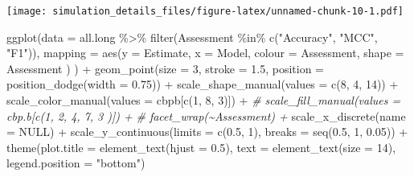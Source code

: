 \documentclass[
]{article}
\newenvironment{Shaded}{\begin{snugshade}}{\end{snugshade}}
\newcommand{\AttributeTok}[1]{\textcolor[rgb]{0.77,0.63,0.00}{#1}}
\newcommand{\CommentTok}[1]{\textcolor[rgb]{0.56,0.35,0.01}{\textit{#1}}}
\newcommand{\ConstantTok}[1]{\textcolor[rgb]{0.00,0.00,0.00}{#1}}
\newcommand{\DecValTok}[1]{\textcolor[rgb]{0.00,0.00,0.81}{#1}}
\newcommand{\FloatTok}[1]{\textcolor[rgb]{0.00,0.00,0.81}{#1}}
\newcommand{\FunctionTok}[1]{\textcolor[rgb]{0.00,0.00,0.00}{#1}}
\newcommand{\NormalTok}[1]{#1}
\newcommand{\SpecialCharTok}[1]{\textcolor[rgb]{0.00,0.00,0.00}{#1}}
\newcommand{\StringTok}[1]{\textcolor[rgb]{0.31,0.60,0.02}{#1}}
\begin{document}
\texttt{[image: simulation\_details\_files/figure-latex/unnamed-chunk-10-1.pdf]}

\begin{Shaded}
\begin{Highlighting}[]
\FunctionTok{ggplot}\NormalTok{(}\AttributeTok{data =}\NormalTok{ all.long }\SpecialCharTok{\%\textgreater{}\%} 
         \FunctionTok{filter}\NormalTok{(Assessment }\SpecialCharTok{\%in\%} \FunctionTok{c}\NormalTok{(}\StringTok{"Accuracy"}\NormalTok{, }\StringTok{"MCC"}\NormalTok{, }\StringTok{"F1"}\NormalTok{)),}
       \AttributeTok{mapping =} \FunctionTok{aes}\NormalTok{(}\AttributeTok{y =}\NormalTok{ Estimate,}
                     \AttributeTok{x =}\NormalTok{ Model, }
                     \AttributeTok{colour =}\NormalTok{ Assessment,}
                     \AttributeTok{shape =}\NormalTok{ Assessment}
\NormalTok{                     )}
\NormalTok{       ) }\SpecialCharTok{+}
  \FunctionTok{geom\_point}\NormalTok{(}\AttributeTok{size =} \DecValTok{3}\NormalTok{, }\AttributeTok{stroke =} \FloatTok{1.5}\NormalTok{,}
             \AttributeTok{position =} \FunctionTok{position\_dodge}\NormalTok{(}\AttributeTok{width =} \FloatTok{0.75}\NormalTok{)) }\SpecialCharTok{+}
  \FunctionTok{scale\_shape\_manual}\NormalTok{(}\AttributeTok{values =} \FunctionTok{c}\NormalTok{(}\DecValTok{8}\NormalTok{, }\DecValTok{4}\NormalTok{, }\DecValTok{14}\NormalTok{)) }\SpecialCharTok{+}
  \FunctionTok{scale\_color\_manual}\NormalTok{(}\AttributeTok{values =}\NormalTok{ cbpb[}\FunctionTok{c}\NormalTok{(}\DecValTok{1}\NormalTok{, }\DecValTok{8}\NormalTok{, }\DecValTok{3}\NormalTok{)]) }\SpecialCharTok{+}
  \CommentTok{\# scale\_fill\_manual(values = cbp.b[c(1, 2, 4, 7, 3 )]) +}
  \CommentTok{\# facet\_wrap(\textasciitilde{}Assessment) +}
  \FunctionTok{scale\_x\_discrete}\NormalTok{(}\AttributeTok{name =} \ConstantTok{NULL}\NormalTok{) }\SpecialCharTok{+}
  \FunctionTok{scale\_y\_continuous}\NormalTok{(}\AttributeTok{limits =} \FunctionTok{c}\NormalTok{(}\FloatTok{0.5}\NormalTok{, }\DecValTok{1}\NormalTok{),}
                     \AttributeTok{breaks =} \FunctionTok{seq}\NormalTok{(}\FloatTok{0.5}\NormalTok{, }\DecValTok{1}\NormalTok{, }\FloatTok{0.05}\NormalTok{)) }\SpecialCharTok{+}
  \FunctionTok{theme}\NormalTok{(}\AttributeTok{plot.title =} \FunctionTok{element\_text}\NormalTok{(}\AttributeTok{hjust =} \FloatTok{0.5}\NormalTok{), }
        \AttributeTok{text =} \FunctionTok{element\_text}\NormalTok{(}\AttributeTok{size =} \DecValTok{14}\NormalTok{),}
        \AttributeTok{legend.position =} \StringTok{"bottom"}\NormalTok{)}
\end{Highlighting}
\end{Shaded}
\end{document}
